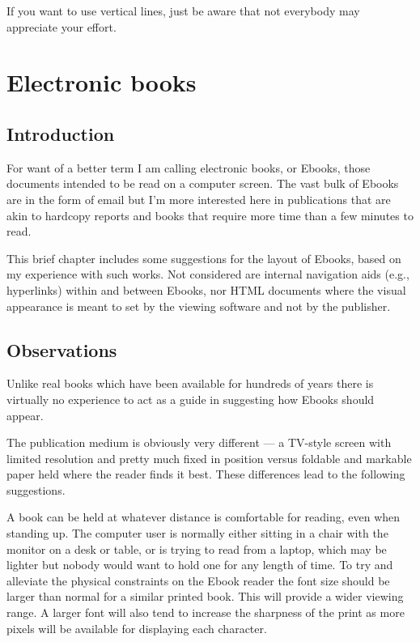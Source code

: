 \documentclass[10pt,letterpaper]{memoir}
\begin{document}
    If you want to use vertical lines, just be aware that not everybody
may appreciate your effort.





\chapter{Electronic books}
\section{Introduction}

    For want of a better term I am calling electronic books, or Ebooks, 
those documents intended to be read on a computer screen. The vast bulk
of Ebooks are in the form of email but I'm more interested here in 
publications that are akin to hardcopy reports and books that require
more time than a few minutes to read.

    This brief chapter includes some suggestions for the
layout of Ebooks, based on my experience with such works. 
Not considered are internal navigation aids
(e.g., hyperlinks) within and between Ebooks, nor HTML documents where
the visual appearance is meant to set by the viewing software and not 
by the publisher.

\section{Observations}

    Unlike real books which have been available for hundreds of years there
is virtually no experience to act as a guide in suggesting how Ebooks should
appear. 

    The publication medium is obviously very different --- a TV-style 
screen with limited resolution and pretty much fixed in position versus
foldable and markable paper held where the reader finds it best.
These differences lead to the following suggestions.

    A book can be held at whatever distance is comfortable for reading, even
when standing up.
The computer user is normally either sitting in a chair with the monitor
on a desk or table, or is trying to read from a laptop, which may be 
lighter but nobody would want to hold one for any length of time. To try
and alleviate the physical constraints on the Ebook reader the font size
should be larger than normal for a similar printed book. This will provide
a wider viewing range. A larger font will also tend to
increase the sharpness of the print as more pixels will be available for
displaying each character.
\end{document}
